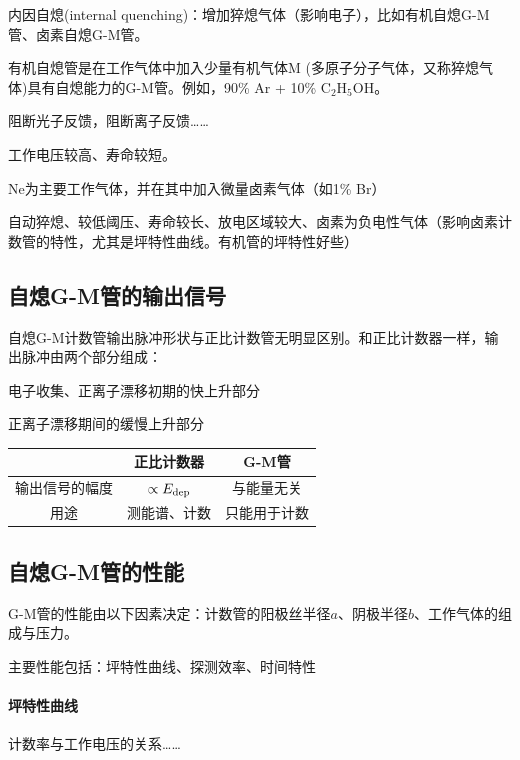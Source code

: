 内因自熄(internal quenching)：增加猝熄气体（影响电子），比如有机自熄G-M管、卤素自熄G-M管。


有机自熄管是在工作气体中加入少量有机气体M (多原子分子气体，又称猝熄气体)具有自熄能力的G-M管。例如，90\% Ar + 10\% C$_2$H$_5$OH。

阻断光子反馈，阻断离子反馈……

工作电压较高、寿命较短。


Ne为主要工作气体，并在其中加入微量卤素气体（如1\% Br）

自动猝熄、较低阈压、寿命较长、放电区域较大、卤素为负电性气体（影响卤素计数管的特性，尤其是坪特性曲线。有机管的坪特性好些）

\subsection{自熄G-M管的输出信号}

自熄G-M计数管输出脉冲形状与正比计数管无明显区别。和正比计数器一样，输出脉冲由两个部分组成：
\begin{compactenum}
	\item 电子收集、正离子漂移初期的快上升部分
	\item 正离子漂移期间的缓慢上升部分
\end{compactenum}
\begin{center}
	\begin{tabular}{ccc}
		\toprule
		&正比计数器&G-M管\\
		\midrule
		输出信号的幅度&$\propto E_{\mathrm{dep}}$&与能量无关\\
		用途&测能谱、计数&只能用于计数\\
		\bottomrule
	\end{tabular}
\end{center}

\subsection{自熄G-M管的性能}

G-M管的性能由以下因素决定：计数管的阳极丝半径$a$、阴极半径$b$、工作气体的组成与压力。

主要性能包括：坪特性曲线、探测效率、时间特性
\paragraph{坪特性曲线}计数率与工作电压的关系……

